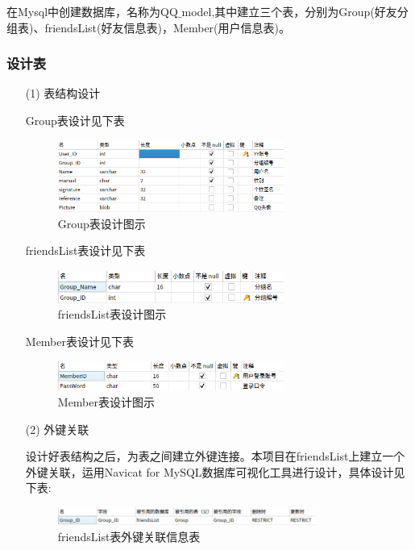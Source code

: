\documentclass{progartcn}
\begin{document}
在Mysql中创建数据库，名称为QQ$ \_ $model,其中建立三个表，分别为Group(好友分组表)、friendsList(好友信息表)，Member(用户信息表)。

\subsubsection{设计表}

\begin{enumerate}[itemsep=0.01pt]
\item[(1)]表结构设计

Group表设计见下表
\begin{figure}[H]
	\centering
	\includegraphics[width=0.7\textwidth]{10.png}
	\caption{\centering  Group表设计图示}
\end{figure}

friendsList表设计见下表
\begin{figure}[H]
	\centering
	\includegraphics[width=0.7\textwidth]{11.png}
	\caption{\centering friendsList表设计图示}
\end{figure}

Member表设计见下表
\begin{figure}[H]
	\centering
	\includegraphics[width=0.7\textwidth]{12.png}
	\caption{\centering Member表设计图示}
\end{figure}

\item[(2)]外键关联

设计好表结构之后，为表之间建立外键连接。本项目在friendsList上建立一个外键关联，运用Navicat for MySQL数据库可视化工具进行设计，具体设计见下表:

\begin{figure}[H]
	\centering
	\includegraphics[width=0.8\textwidth]{13.png}
	\caption{\centering friendsList表外键关联信息表}
\end{figure}


\end{enumerate}
\end{document}
